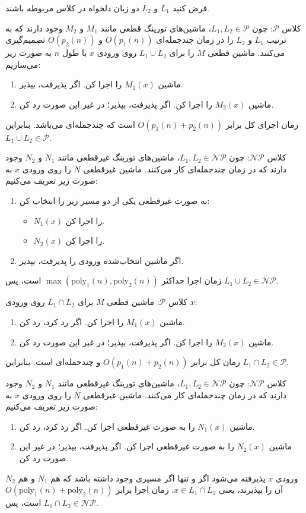 فرض کنید $L_1$ و $L_2$ دو زبان دلخواه در کلاس مربوطه باشند.


{کلاس $\mathcal{P}$:}
چون $L_1, L_2 \in \mathcal{P}$، ماشین‌های تورینگ قطعی مانند $M_1$ و $M_2$ وجود دارند که به ترتیب $L_1$ و $L_2$ را در زمان چندجمله‌ای $O(p_1(n))$ و $O(p_2(n))$ تصمیم‌گیری می‌کنند.
ماشین قطعی $M$ را برای $L_1 \cup L_2$ روی ورودی $x$ با طول $n$ به صورت زیر می‌سازیم:
\begin{enumerate}
    \item ماشین $M_1(x)$ را اجرا کن. اگر پذیرفت، {بپذیر}.
    \item ماشین $M_2(x)$ را اجرا کن. اگر پذیرفت، {بپذیر}؛ در غیر این صورت {رد کن}.
\end{enumerate}
زمان اجرای کل برابر $O(p_1(n) + p_2(n))$ است که چندجمله‌ای می‌باشد. بنابراین $L_1 \cup L_2 \in \mathcal{P}$.

{کلاس $\mathcal{NP}$:}
چون $L_1, L_2 \in \mathcal{NP}$، ماشین‌های تورینگ غیرقطعی مانند $N_1$ و $N_2$ وجود دارند که در زمان چندجمله‌ای کار می‌کنند.
ماشین غیرقطعی $N$ را روی ورودی $x$ به صورت زیر تعریف می‌کنیم:
\begin{enumerate}
    \item به صورت غیرقطعی یکی از دو مسیر زیر را انتخاب کن:
    \begin{itemize}
        \item $N_1(x)$ را اجرا کن.
        \item $N_2(x)$ را اجرا کن.
    \end{itemize}
    \item اگر ماشین انتخاب‌شده ورودی را پذیرفت، {بپذیر}.
\end{enumerate}
زمان اجرا حداکثر $\max(\text{poly}_1(n), \text{poly}_2(n))$ است، پس $L_1 \cup L_2 \in \mathcal{NP}$.


{کلاس $\mathcal{P}$:}
ماشین قطعی $M$ برای $L_1 \cap L_2$ روی ورودی $x$:
\begin{enumerate}
    \item ماشین $M_1(x)$ را اجرا کن. اگر رد کرد، {رد کن}.
    \item ماشین $M_2(x)$ را اجرا کن. اگر پذیرفت، {بپذیر}؛ در غیر این صورت {رد کن}.
\end{enumerate}
زمان کل برابر $O(p_1(n) + p_2(n))$ و چندجمله‌ای است. بنابراین $L_1 \cap L_2 \in \mathcal{P}$.

{کلاس $\mathcal{NP}$:}
چون $L_1, L_2 \in \mathcal{NP}$، ماشین‌های تورینگ غیرقطعی مانند $N_1$ و $N_2$ وجود دارند که در زمان چندجمله‌ای کار می‌کنند.
ماشین غیرقطعی $N$ را روی ورودی $x$ به صورت زیر تعریف می‌کنیم:
\begin{enumerate}
    \item ماشین $N_1(x)$ را به صورت غیرقطعی اجرا کن. اگر رد کرد، {رد کن}.
    \item ماشین $N_2(x)$ را به صورت غیرقطعی اجرا کن. اگر پذیرفت، {بپذیر}؛ در غیر این صورت {رد کن}.
\end{enumerate}
ورودی $x$ پذیرفته می‌شود اگر و تنها اگر مسیری وجود داشته باشد که هم $N_1$ و هم $N_2$ آن را بپذیرند، یعنی $x \in L_1 \cap L_2$.
زمان اجرا برابر $O(\text{poly}_1(n) + \text{poly}_2(n))$ است، پس $L_1 \cap L_2 \in \mathcal{NP}$.

